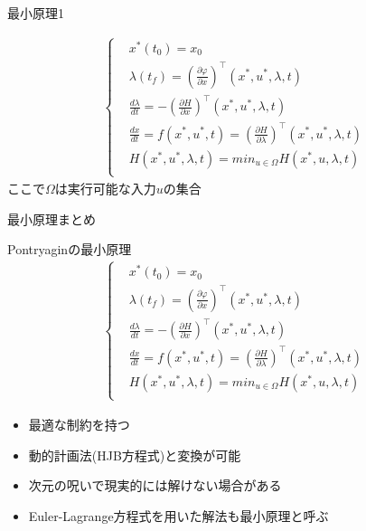 \documentclass[twocolumn, dvipdfmx,12pt]{beamer}
\begin{document}
\begin{frame}{最小原理1}
\begin{multicols}{2}
            \begin{align*}
                \begin{cases}
                    &x^*(t_0)=x_0 \\
                    &\lambda(t_f)=\left(\frac{\partial \varphi}{\partial x}\right)^\top(x^*, u^*, \lambda, t) \\
                    &\frac{d\lambda}{dt}=-\left(\frac{\partial H}{\partial x}\right)^\top(x^*, u^*, \lambda, t)\\
                    &\frac{dx}{dt}=f(x^*,u^*,t)=\left(\frac{\partial H}{\partial \lambda}\right)^\top(x^*, u^*, \lambda, t) \\
                    &H(x^*, u^*, \lambda, t)=min _{u \in \Omega}H(x^*, u, \lambda, t)\\
                \end{cases}
            \end{align*}
            ここで$\Omega$は実行可能な入力$u$の集合


        \end{multicols}
    \end{frame}

    \begin{frame}{最小原理まとめ}
        \footnotesize

        \begin{block}{Pontryaginの最小原理}
            \begin{align*}
                \begin{cases}
                    &x^*(t_0)=x_0 \\
                    &\lambda(t_f)=\left(\frac{\partial \varphi}{\partial x}\right)^\top(x^*, u^*, \lambda, t) \\
                    &\frac{d\lambda}{dt}=-\left(\frac{\partial H}{\partial x}\right)^\top(x^*, u^*, \lambda, t)\\
                    &\frac{dx}{dt}=f(x^*,u^*,t)=\left(\frac{\partial H}{\partial \lambda}\right)^\top(x^*, u^*, \lambda, t) \\
                    &H(x^*, u^*, \lambda, t)=min _{u \in \Omega}H(x^*, u, \lambda, t)\\
                \end{cases}
            \end{align*}
        \end{block}
        
        \begin{itemize}
            \item 最適な制約を持つ
            \item 動的計画法(HJB方程式)と変換が可能
            \item 次元の呪いで現実的には解けない場合がある
            \item Euler-Lagrange方程式を用いた解法も最小原理と呼ぶ
        \end{itemize}

    \end{frame}
\end{document}
